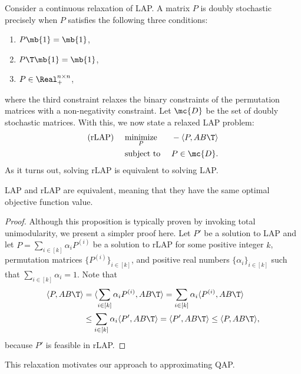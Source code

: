 \documentclass[10pt,journal,cspaper,compsoc]{IEEEtran}
\begin{document}
Consider a continuous relaxation of LAP.  
A matrix $P$ is doubly stochastic precisely when $P$ satisfies the following three conditions: 
\begin{enumerate}
\item	$P\mb{1} = \mb{1}$,
\item	$P\T \mb{1}=\mb{1}$, %
\item 	$P \in  \Real_+^{n \times n}$,
\end{enumerate}
where the third constraint relaxes the binary constraints of the permutation matrices with a non-negativity constraint.  
Let $\mc{D}$ be the set of doubly stochastic matrices.
With this, we now state a relaxed LAP problem:
\begin{subequations} \label{eq:rLAP}
\begin{align}
		\text{(rLAP) } \quad &\underset{P}{\text{minimize}}  &&-\langle P, AB\T \rangle \\
		&\text{subject to } && P \in \mc{D}.
\end{align}
\end{subequations}
As it turns out, solving rLAP is equivalent to solving LAP.
\begin{prop}
	LAP and rLAP are equivalent, meaning that they have the same optimal objective function value.
\end{prop}
\begin{proof}
	Although this proposition is typically proven by invoking total unimodularity, we present a simpler proof here.	Let $P'$ be a solution to LAP and let $P = \sum_{i\in[k]} \alpha_i P^{(i)}$ be a solution to rLAP for some positive integer $k$, permutation matrices $\{P^{(i)}\}_{i \in [k]}$, and positive real numbers $\{\alpha_i\}_{i \in[k]}$ such that $\sum_{i \in [k]} \alpha_i=1$.  Note that 
	\begin{align*}
	\langle P,AB\T \rangle &= \langle  \sum_{i\in[k]} \alpha_i P^{(i)}, AB\T \rangle=  \sum_{i\in[k]} \alpha_i \langle  P^{(i)}, AB\T \rangle	 \\
	&\leq \sum_{i\in[k]} \alpha_i \langle P', AB\T  \rangle = \langle P', AB\T \rangle \leq \langle P, AB\T \rangle,
	\end{align*}
	because $P'$ is feasible in rLAP.
	\end{proof}
This relaxation motivates our approach to approximating QAP.
\end{document}
